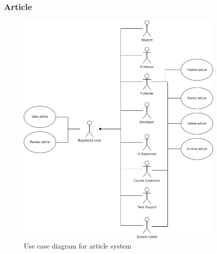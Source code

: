 \subsubsection{Article}
\begin{figure}[h]
	\centering
	\includegraphics[width=0.9\textwidth]{images/UC-article.png}
	\caption{Use case diagram for article system}
	\label{fig:UC-article}
\end{figure}

\newpage
